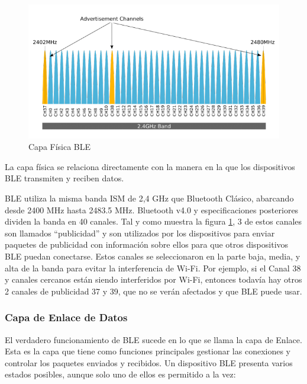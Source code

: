 \begin{figure}[h] \centering
	\includegraphics[width=15cm]{graphs/ble_capa_fisica.png} 
	\caption{Capa Física BLE \cite{bluetoothlowenergy}}
	\label{figure:capafisica}
\end{figure}

La capa física se relaciona directamente con la manera en la que los dispositivos \ac{BLE} transmiten y reciben datos.

\ac{BLE} utiliza la misma banda \ac{ISM} de 2,4 GHz que Bluetooth Clásico, abarcando desde 2400 MHz hasta 2483.5 MHz. Bluetooth v4.0 y especificaciones posteriores dividen la banda en 40 canales. Tal y como muestra la figura \ref{figure:capafisica}, 3 de estos canales son llamados “publicidad” y son utilizados por los dispositivos para enviar paquetes de publicidad con información sobre ellos para que otros dispositivos \ac{BLE} puedan conectarse. Estos canales se seleccionaron en la parte baja, media, y alta de la banda para evitar la interferencia de Wi-Fi. Por ejemplo, si el Canal 38 y canales cercanos están siendo interferidos por Wi-Fi, entonces todavía hay otros 2 canales de publicidad 37 y 39, que no se verán afectados y que \ac{BLE} puede usar.

\subsubsection{Capa de Enlace de Datos}
El verdadero funcionamiento de \ac{BLE} sucede en lo que se llama la capa de Enlace. Esta es la capa que tiene como funciones principales gestionar las conexiones y controlar los paquetes enviados y recibidos. Un dispositivo \ac{BLE} presenta varios estados posibles, aunque solo uno de ellos es permitido a la vez:

